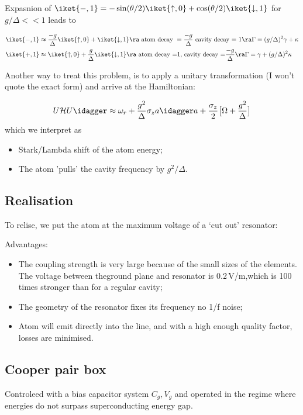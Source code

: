  Expasnion of $ \iket{-,1} = -\sin(\theta/2)\iket{\uparrow,0} + \cos(\theta/2)\iket{\downarrow,1} $ for $ g/\Delta<<1 $ leads to 
 
 \[
 	\begin{aligned}
	 	\iket{-,1} &\approx \frac{-g}{\Delta}\iket{\uparrow,0} + \iket{\downarrow,1} \ra \text{ atom decay } = \frac{-g}{\Delta} \text{ cavity decay = 1}\ra \Gamma = (g/\Delta)^2\gamma+\kappa\\
	 	\iket{+,1} & \approx \iket{\uparrow,0} + \frac{g}{\Delta}\iket{\downarrow,1}\ra \text{ atom decay =1, }\text{cavity decay =} \frac{-g}{\Delta} \ra \Gamma = \gamma+  (g/\Delta)^2\kappa
 	\end{aligned}
 \]

 Another way to treat this problem, is to apply a unitary transformation (I won't quote the exact form) and arrive at the Hamiltonian:
 
 \[
 	U\mathcal{H}U\idagger \approx \omega_r+\frac{g^2}{\Delta}\sigma_z a\idagger a + \frac{\sigma_z}{2}\big[\Omega + \frac{g^2}{\Delta}\big]
 \]
 \noindent which we interpret as
 \begin{itemize}
 	\item Stark/Lambda shift of the atom energy;
 	\item The atom 'pulls' the cavity frequency by $ g^2/\Delta $.
 \end{itemize}

 \subsection{Realisation}
  To relise, we put the atom at the maximum voltage of a `cut out' resonator:
  
  Advantages:
  \begin{itemize}
  	\item The coupling strength is very large because of the small sizes of the elements. The voltage between theground plane and resonator is 0.2\,V/m,which is 100 times stronger than for a regular cavity;
  	\item The geometry of the resonator fixes its frequency \ra no 1/f noise;
  	\item Atom will emit directly into the line, and with a high enough quality factor, losses are minimised.
  \end{itemize}
 
 \subsection{Cooper pair box}
  Controleed with a bias capacitor system $ C_g, V_g $ and operated in the regime where energies do not surpass superconducting energy gap.
  
